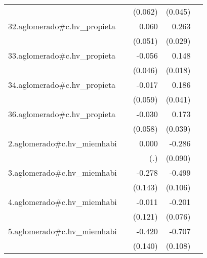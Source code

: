 {\begin{longtable}{l*{4}{D{.}{.}{-1}}}
            &                     &     (0.062)         &     (0.045)         &                     \\
\addlinespace
32.aglomerado#c.hv\_propieta&                     &       0.060         &       0.263\sym{***}&                     \\
            &                     &     (0.051)         &     (0.029)         &                     \\
\addlinespace
33.aglomerado#c.hv\_propieta&                     &      -0.056         &       0.148\sym{***}&                     \\
            &                     &     (0.046)         &     (0.018)         &                     \\
\addlinespace
34.aglomerado#c.hv\_propieta&                     &      -0.017         &       0.186\sym{***}&                     \\
            &                     &     (0.059)         &     (0.041)         &                     \\
\addlinespace
36.aglomerado#c.hv\_propieta&                     &      -0.030         &       0.173\sym{***}&                     \\
            &                     &     (0.058)         &     (0.039)         &                     \\
\addlinespace
2.aglomerado#c.hv\_miemhabi&                     &       0.000         &      -0.286\sym{**} &                     \\
            &                     &         (.)         &     (0.090)         &                     \\
\addlinespace
3.aglomerado#c.hv\_miemhabi&                     &      -0.278         &      -0.499\sym{***}&                     \\
            &                     &     (0.143)         &     (0.106)         &                     \\
\addlinespace
4.aglomerado#c.hv\_miemhabi&                     &      -0.011         &      -0.201\sym{**} &                     \\
            &                     &     (0.121)         &     (0.076)         &                     \\
\addlinespace
5.aglomerado#c.hv\_miemhabi&                     &      -0.420\sym{**} &      -0.707\sym{***}&                     \\
            &                     &     (0.140)         &     (0.108)         &                     \\

\end{longtable}}
